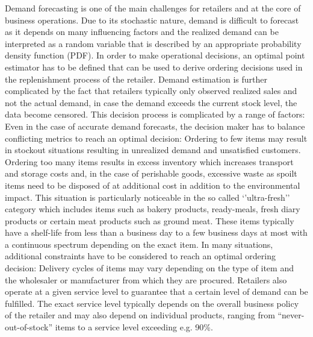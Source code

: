\documentclass[BCOR=1mm, DIV=calc,10pt,
twoside=true,
twocolumn,
headings=normal]{scrartcl}
\begin{document}
Demand forecasting is one of the main challenges for retailers and at the core of business
operations. Due to its stochastic nature, demand is difficult to forecast as it depends on
many influencing factors and the realized demand can be interpreted as a random variable
that is described by an appropriate probability density function (PDF). In order to make
operational decisions, an optimal point estimator has to be defined that  can be used to
derive ordering decisions used in the replenishment process of the retailer. Demand
estimation is further complicated by the fact that retailers typically only observed
realized sales and not the actual demand, in case the demand exceeds the current stock
level, the data become censored. This decision process is complicated by a range of
factors: Even in the case of accurate  demand forecasts, the decision maker has to balance
conflicting metrics to reach an optimal decision: Ordering to few items may result in
stockout situations resulting in unrealized demand and unsatisfied customers. Ordering too
many items results in excess inventory which increases transport and storage costs and, in
the case of perishable goods, excessive waste as spoilt items need to be disposed of at
additional cost in addition to  the environmental impact. This situation is particularly
noticeable in the so called `'ultra-fresh'' category which includes items such as bakery
products, ready-meals, fresh diary products or certain meat products such as ground meat.
These items typically have a shelf-life from less than a business day to a few business
days at most with a continuous spectrum  depending on the exact item. In many situations,
additional constraints have to be considered to reach an optimal ordering decision:
Delivery cycles of items may vary depending on the type of item and the wholesaler or
manufacturer from which  they are procured. Retailers also operate at a given service
level to guarantee that a certain level of demand can be fulfilled. The exact service
level typically depends on the overall business policy of the retailer and may also depend
on individual products, ranging from ``never-out-of-stock'' items to a service level
exceeding e.g. 90\%.
\end{document}
